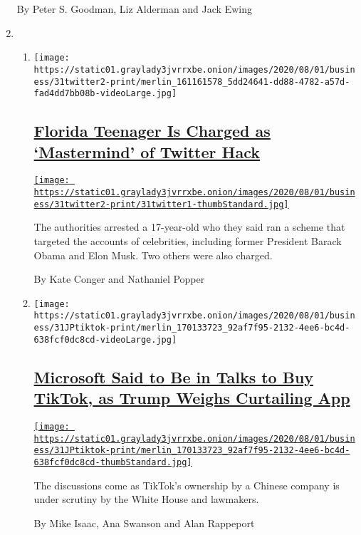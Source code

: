 \begin{enumerate}
  By Peter S. Goodman, Liz Alderman and Jack Ewing
\item
  \begin{enumerate}
  \def\labelenumii{\arabic{enumii}.}
  \item
    \texttt{[image: https://static01.graylady3jvrrxbe.onion/images/2020/08/01/business/31twitter2-print/merlin\_161161578\_5dd24641-dd88-4782-a57d-fad4dd7bb08b-videoLarge.jpg]}

    \hypertarget{florida-teenager-is-charged-as-mastermind-of-twitter-hack}{%
    \subsection{\texorpdfstring{\href{/2020/07/31/technology/twitter-hack-arrest.html}{Florida
    Teenager Is Charged as `Mastermind' of Twitter
    Hack}}{Florida Teenager Is Charged as `Mastermind' of Twitter Hack}}\label{florida-teenager-is-charged-as-mastermind-of-twitter-hack}}

    \href{/2020/07/31/technology/twitter-hack-arrest.html}{\texttt{[image: https://static01.graylady3jvrrxbe.onion/images/2020/08/01/business/31twitter2-print/31twitter1-thumbStandard.jpg]}}

    The authorities arrested a 17-year-old who they said ran a scheme
    that targeted the accounts of celebrities, including former
    President Barack Obama and Elon Musk. Two others were also charged.

    By Kate Conger and Nathaniel Popper
  \item
    \texttt{[image: https://static01.graylady3jvrrxbe.onion/images/2020/08/01/business/31JPtiktok-print/merlin\_170133723\_92af7f95-2132-4ee6-bc4d-638fcf0dc8cd-videoLarge.jpg]}

    \hypertarget{microsoft-said-to-be-in-talks-to-buy-tiktok-as-trump-weighs-curtailing-app}{%
    \subsection{\texorpdfstring{\href{/2020/07/31/technology/tiktok-microsoft.html}{Microsoft
    Said to Be in Talks to Buy TikTok, as Trump Weighs Curtailing
    App}}{Microsoft Said to Be in Talks to Buy TikTok, as Trump Weighs Curtailing App}}\label{microsoft-said-to-be-in-talks-to-buy-tiktok-as-trump-weighs-curtailing-app}}

    \href{/2020/07/31/technology/tiktok-microsoft.html}{\texttt{[image: https://static01.graylady3jvrrxbe.onion/images/2020/08/01/business/31JPtiktok-print/merlin\_170133723\_92af7f95-2132-4ee6-bc4d-638fcf0dc8cd-thumbStandard.jpg]}}

    The discussions come as TikTok's ownership by a Chinese company is
    under scrutiny by the White House and lawmakers.

    By Mike Isaac, Ana Swanson and Alan Rappeport
  \end{enumerate}
\end{enumerate}

